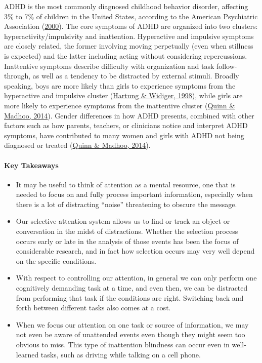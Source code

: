 \documentclass[
]{krantz}
\providecommand{\tightlist}{%
  \setlength{\itemsep}{0pt}\setlength{\parskip}{0pt}}
\begin{document}
ADHD is the most commonly diagnosed childhood behavior disorder, affecting 3\% to 7\% of children in the United States, according to the American Psychiatric Association (\protect\hyperlink{ref-APA2000}{2000}). The core symptoms of ADHD are organized into two clusters: hyperactivity/impulsivity and inattention. Hyperactive and impulsive symptoms are closely related, the former involving moving perpetually (even when stillness is expected) and the latter including acting without considering repercussions. Inattentive symptoms describe difficulty with organization and task follow-through, as well as a tendency to be distracted by external stimuli. Broadly speaking, boys are more likely than girls to experience symptoms from the hyperactive and impulsive cluster (\protect\hyperlink{ref-Hartung1998}{Hartung \& Widiger, 1998}), while girls are more likely to experience symptoms from the inattentive cluster (\protect\hyperlink{ref-Quinn2014}{Quinn \& Madhoo, 2014}). Gender differences in how ADHD presents, combined with other factors such as how parents, teachers, or clinicians notice and interpret ADHD symptoms, have contributed to many women and girls with ADHD not being diagnosed or treated (\protect\hyperlink{ref-Quinn2014}{Quinn \& Madhoo, 2014}).

\hypertarget{key-takeaways-2}{%
\paragraph*{Key Takeaways}\label{key-takeaways-2}}

\begin{itemize}
\tightlist
\item
  It may be useful to think of attention as a mental resource, one that is needed to focus on and fully process important information, especially when there is a lot of distracting ``noise'' threatening to obscure the message.
\item
  Our selective attention system allows us to find or track an object or conversation in the midst of distractions. Whether the selection process occurs early or late in the analysis of those events has been the focus of considerable research, and in fact how selection occurs may very well depend on the specific conditions.
\item
  With respect to controlling our attention, in general we can only perform one cognitively demanding task at a time, and even then, we can be distracted from performing that task if the conditions are right. Switching back and forth between different tasks also comes at a cost.
\item
  When we focus our attention on one task or source of information, we may not even be aware of unattended events even though they might seem too obvious to miss. This type of inattention blindness can occur even in well-learned tasks, such as driving while talking on a cell phone.
\end{itemize}
\end{document}

